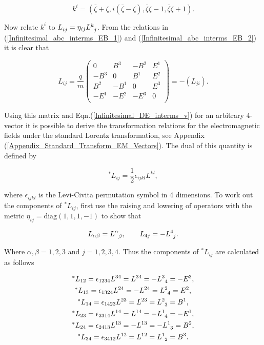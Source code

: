 \begin{equation}\label{Infinitesimal_K_Unit_Vector_Formula}
k^i = \left(\bar{\zeta} + \zeta,i(\bar{\zeta} - \zeta),\bar{\zeta}\zeta - 1,\bar{\zeta}\zeta + 1\right).
\end{equation}

\noindent Now relate $k^i$ to $\tensor{L}{_i_j} = \eta_{ij} \tensor{L}{^k_j}$. From the relations in (\ref{Infinitesimal_abc_interms_EB_1}) and (\ref{Infinitesimal_abc_interms_EB_2}) it is clear that

\begin{equation*}  
L_{ij} = 
\frac{q}{m}
\left(
\begin{array}{cccc}
0    & B^3  & -B^2 & E^1 \\
-B^3 & 0    & B^1  & E^2 \\
B^2  & -B^1 & 0    & E^3 \\
-E^1 & -E^2 & -E^3 & 0   \\
\end{array}
\right)
=
-(L_{ji}).
\end{equation*}

\noindent Using this matrix and Eqn.(\ref{Infinitesimal_DE_interms_v}) for an arbitrary $4$-vector it is possible to derive the transformation relations for the electromagnetic fields under the standard Lorentz transformation, see Appendix (\ref{Appendix_Standard_Transform_EM_Vectors}). The dual of this quantity is defined by

\begin{equation*}
^*L_{ij} = \frac{1}{2} \epsilon_{ijkl} L^{kl},
\end{equation*}

\noindent where $\epsilon_{ijkl}$ is the Levi-Civita permutation symbol in 4 dimensions. To work out the components of $^*L_{ij}$, first use the raising and lowering of operators with the metric $\eta_{ij} = \text{diag}(1,1,1,-1)$ to show that  

\begin{equation*}
L_{\alpha \beta} = \tensor{L}{^\alpha_\beta}, \qquad L_{4 j} = - \tensor{L}{^4_j}.
\end{equation*}

\noindent Where $\alpha,\beta = 1,2,3$ and $j = 1,2,3,4$. Thus the components of $^*L_{ij}$ are calculated as follows

\begin{gather*}
^*L_{12} = \epsilon_{1234}L^{34} = L^{34} = -\tensor{L}{^3_4} = -E^3, \\
^*L_{13} = \epsilon_{1324}L^{24} = - L^{24} = \tensor{L}{^2_4} = E^2,  \\
^*L_{14} = \epsilon_{1423}L^{23} = L^{23} = \tensor{L}{^2_3} =  B^1, \\
^*L_{23} = \epsilon_{2314}L^{14} = L^{14} = -\tensor{L}{^1_4} = -E^1, \\
^*L_{24} = \epsilon_{2413}L^{13} = -L^{13} =- \tensor{L}{^1_3} =  B^2,\\
^*L_{34} = \epsilon_{3412}L^{12} = L^{12} = \tensor{L}{^1_2} = B^3. \\
\end{gather*}

